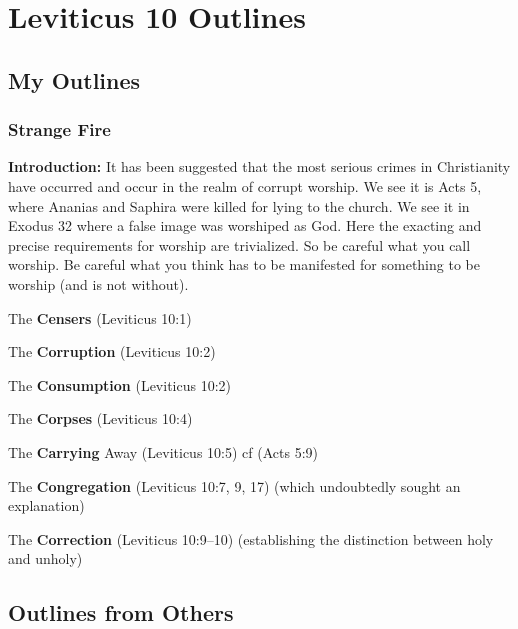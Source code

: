 \section{Leviticus 10 Outlines}

\subsection{My Outlines}

\subsubsection{Strange Fire}
\textbf{Introduction: }It has been suggested that the most serious crimes in Christianity have occurred and occur in the realm of corrupt worship.  We see it is Acts 5, where Ananias and Saphira were killed for lying  to the church.  We see it in Exodus 32 where a false image was worshiped as God. Here the exacting and precise requirements for worship are trivialized. So be careful what you call worship. Be careful what you think has to be manifested for something to be worship (and is not without). 
\begin{compactenum}[I.][7]
	\item The \textbf{Censers} (Leviticus 10:1)
	\item The \textbf{Corruption} (Leviticus 10:2)
	\item The \textbf{Consumption} (Leviticus 10:2)
	\item The \textbf{Corpses}  (Leviticus 10:4)
	\item The \textbf{Carrying} Away (Leviticus 10:5) cf (Acts 5:9)
	\item The \textbf{Congregation}  (Leviticus 10:7, 9, 17) (which undoubtedly sought an explanation)
	\item The \textbf{Correction}  (Leviticus 10:9--10) (establishing the distinction between holy and unholy)
\end{compactenum}

\subsection{Outlines from Others}